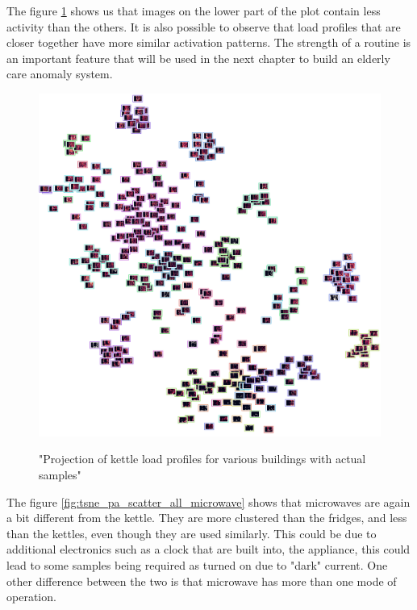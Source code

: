The figure \ref{fig:tsne_pa_img_scatter_all_kettle} shows us that images on the lower part 
of the plot contain less activity than the others. It is also possible to observe that
load profiles that are closer together have more similar activation patterns.
The strength of a routine is an important feature that will be used
in the next chapter to build an elderly care anomaly system.

\begin{figure}[H]
	\centering
	\caption{"Projection of kettle load profiles for various buildings with actual samples"}
	\includegraphics[width=.9\textwidth]{Figures/TSNE/TSNE_per_appliance/all/img_scatter_allkettle.png}
	\label{fig:tsne_pa_img_scatter_all_kettle}
\end{figure}

The figure \ref{fig:tsne_pa_scatter_all_microwave} shows that microwaves are again a bit different from the kettle.
They are more clustered than the fridges, and less than the kettles, even though they are used similarly.
This could be due to additional electronics such as a clock that are built into,
the appliance, this could lead to some samples being required as turned on due to 
"dark" current. One other difference between the two is that microwave has more than one mode of operation.

